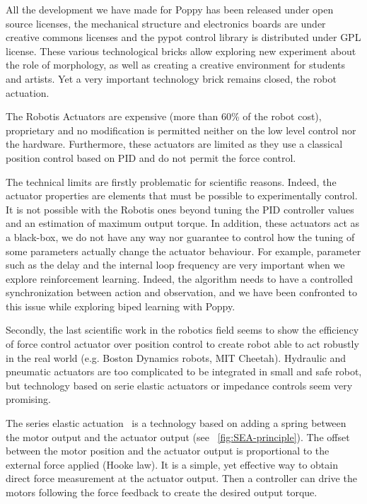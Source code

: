 All the development we have made for Poppy has been released under open source licenses, the mechanical structure and electronics boards are under creative commons licenses and the pypot control library is distributed under GPL license. These various technological bricks allow exploring new experiment about the role of morphology, as well as creating a creative environment for students and artists. Yet a very important technology brick remains closed, the robot actuation.

The Robotis Actuators are expensive (more than 60\% of the robot cost), proprietary and no modification is permitted neither on the low level control nor the hardware. Furthermore, these actuators are limited as they use a classical position control based on PID and do not permit the force control.

The technical limits are firstly problematic for scientific reasons. Indeed, the actuator properties are elements that must be possible to experimentally control. It is not possible with the Robotis ones beyond tuning the PID controller values and an estimation of maximum output torque. In addition, these actuators act as a black-box, we do not have any way nor guarantee to control how the tuning of some parameters actually change the actuator behaviour. For example, parameter such as the delay and the internal loop frequency are very important when we explore reinforcement learning. Indeed, the algorithm needs to have a controlled synchronization between action and observation, and we have been confronted to this issue while exploring biped learning with Poppy.

Secondly, the last scientific work in the robotics field seems to show the efficiency of force control actuator over position control to create robot able to act robustly in the real world (e.g. Boston Dynamics robots, MIT Cheetah). Hydraulic and pneumatic actuators are too complicated to be integrated in small and safe robot, but technology based on serie elastic actuators or impedance controls seem very promising.

The series elastic actuation~\parencite{pratt1995series} is a technology based on adding a spring between the motor output and the actuator output (see \figurename~\ref{fig:SEA-principle}). The offset between the motor position and the actuator output is proportional to the external force applied (Hooke law). It is a simple, yet effective way to obtain direct force measurement at the actuator output. Then a controller can drive the motors following the force feedback to create the desired output torque.

